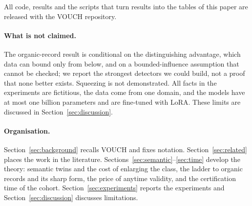 All code, results and the scripts that turn results into the tables of this paper are
released with the VOUCH repository.

\paragraph{What is not claimed.} The organic-record result is conditional on the
distinguishing advantage, which data can bound only from below, and on a bounded-influence
assumption that cannot be checked; we report the strongest detectors we could build, not
a proof that none better exists. Squeezing is not demonstrated. All facts in the
experiments are fictitious, the data come from one domain, and the models have at most
one billion parameters and are fine-tuned with LoRA. These limits are discussed in
Section~\ref{sec:discussion}.

\paragraph{Organisation.} Section~\ref{sec:background} recalls VOUCH and fixes notation.
Section~\ref{sec:related} places the work in the literature.
Sections~\ref{sec:semantic}--\ref{sec:time} develop the theory: semantic twins and the cost
of enlarging the class, the ladder to organic records and its sharp form, the price of
anytime validity, and the certification time of the cohort. Section~\ref{sec:experiments} reports
the experiments and Section~\ref{sec:discussion} discusses limitations.
